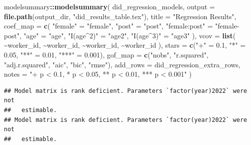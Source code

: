 \documentclass[
]{article}
\newenvironment{Shaded}{\begin{snugshade}}{\end{snugshade}}
\newcommand{\AttributeTok}[1]{\textcolor[rgb]{0.13,0.29,0.53}{#1}}
\newcommand{\FloatTok}[1]{\textcolor[rgb]{0.00,0.00,0.81}{#1}}
\newcommand{\FunctionTok}[1]{\textcolor[rgb]{0.13,0.29,0.53}{\textbf{#1}}}
\newcommand{\NormalTok}[1]{#1}
\newcommand{\OtherTok}[1]{\textcolor[rgb]{0.56,0.35,0.01}{#1}}
\newcommand{\SpecialCharTok}[1]{\textcolor[rgb]{0.81,0.36,0.00}{\textbf{#1}}}
\newcommand{\StringTok}[1]{\textcolor[rgb]{0.31,0.60,0.02}{#1}}
\begin{document}
\begin{Shaded}
\begin{Highlighting}[]
\NormalTok{modelsummary}\SpecialCharTok{::}\FunctionTok{modelsummary}\NormalTok{(}
\NormalTok{    did\_regression\_models,}
    \AttributeTok{output =} \FunctionTok{file.path}\NormalTok{(output\_dir, }\StringTok{"did\_results\_table.tex"}\NormalTok{),}
    \AttributeTok{title =} \StringTok{"Regression Results"}\NormalTok{,}
    \AttributeTok{coef\_map =} \FunctionTok{c}\NormalTok{(}
        \StringTok{"female"} \OtherTok{=} \StringTok{"female"}\NormalTok{,}
        \StringTok{"post"} \OtherTok{=} \StringTok{"post"}\NormalTok{,}
        \StringTok{"female:post"} \OtherTok{=} \StringTok{"female{-}post"}\NormalTok{,}
        \StringTok{"age"} \OtherTok{=} \StringTok{"age"}\NormalTok{,}
        \StringTok{"I(age\^{}2)"} \OtherTok{=} \StringTok{"age2"}\NormalTok{,}
        \StringTok{"I(age\^{}3)"} \OtherTok{=} \StringTok{"age3"}
\NormalTok{    ),}
    \AttributeTok{vcov =} \FunctionTok{list}\NormalTok{(}
        \SpecialCharTok{\textasciitilde{}}\NormalTok{worker\_id,}
        \SpecialCharTok{\textasciitilde{}}\NormalTok{worker\_id,}
        \SpecialCharTok{\textasciitilde{}}\NormalTok{worker\_id,}
        \SpecialCharTok{\textasciitilde{}}\NormalTok{worker\_id}
\NormalTok{    ),}
    \AttributeTok{stars =} \FunctionTok{c}\NormalTok{(}\StringTok{"+"} \OtherTok{=} \FloatTok{0.1}\NormalTok{, }\StringTok{"*"} \OtherTok{=} \FloatTok{0.05}\NormalTok{, }\StringTok{"**"} \OtherTok{=} \FloatTok{0.01}\NormalTok{, }\StringTok{"***"} \OtherTok{=} \FloatTok{0.001}\NormalTok{),}
    \AttributeTok{gof\_map =} \FunctionTok{c}\NormalTok{(}\StringTok{"nobs"}\NormalTok{, }\StringTok{"r.squared"}\NormalTok{, }\StringTok{"adj.r.squared"}\NormalTok{, }\StringTok{"aic"}\NormalTok{, }\StringTok{"bic"}\NormalTok{, }\StringTok{"rmse"}\NormalTok{),}
    \AttributeTok{add\_rows =}\NormalTok{ did\_regression\_extra\_rows,}
    \AttributeTok{notes =} \StringTok{"+ p \textless{} 0.1, * p \textless{} 0.05, ** p \textless{} 0.01, *** p \textless{} 0.001"}
\NormalTok{)}
\end{Highlighting}
\end{Shaded}

\begin{verbatim}
## Model matrix is rank deficient. Parameters `factor(year)2022` were not
##   estimable.
## Model matrix is rank deficient. Parameters `factor(year)2022` were not
##   estimable.
\end{verbatim}
\end{document}
